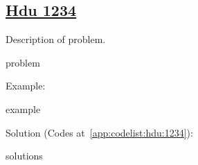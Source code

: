 \subsection{\href{https://www.weblink.com}{Hdu 1234}}\label{app:problemlist:hdu:1234}

Description of problem.\par

problem


Example:\par

example


Solution (Codes at~\ref{app:codelist:hdu:1234}):\par

solutions


